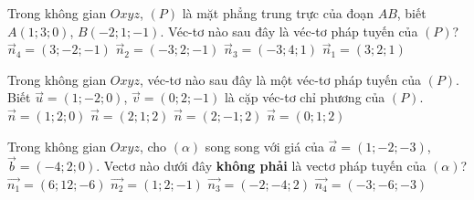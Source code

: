 \begin{ex}%
	Trong không gian $Oxyz$, $(P)$ là mặt phẳng trung trực của đoạn $AB$, biết $A(1;3;0)$, $B(-2;1;-1)$. Véc-tơ nào sau đây là véc-tơ pháp tuyến của $(P)$?
	\choice
	{$\overrightarrow{n}_4=(3;-2;-1)$}
	{$\overrightarrow{n}_2=(-3;2;-1)$}
	{$\overrightarrow{n}_3=(-3;4;1)$}
	{\True $\overrightarrow{n}_1=(3;2;1)$}
\end{ex}
\begin{ex}%
	Trong không gian $Oxyz$, véc-tơ nào sau đây là một véc-tơ pháp tuyến của $(P)$. Biết $\vec{u}=(1;-2;0)$, $\vec{v}=(0;2;-1)$ là cặp véc-tơ chỉ phương của $(P)$.
	\choice
	{$\vec{n}=(1;2;0)$}
	{\True $\vec{n}=(2;1;2)$}
	{$\vec{n}=(2;-1;2)$}
	{$\vec{n}=(0;1;2)$}
\end{ex}
\begin{ex}
	Trong không gian  $Oxyz$, cho $(\alpha)$ song song với giá của $\vec{a}=(1;-2;-3)$, $\vec{b}=(-4;2;0)$. Vectơ nào dưới đây \textbf{không phải} là vectơ pháp tuyến của $(\alpha)$?
	\choice
	{$\vec{n_1}=(6;12;-6)$}
	{$\vec{n_2}=(1;2;-1)$}
	{$\vec{n_3}=(-2;-4;2)$}
	{\True $\vec{n_4}=(-3;-6;-3)$}
\end{ex}

